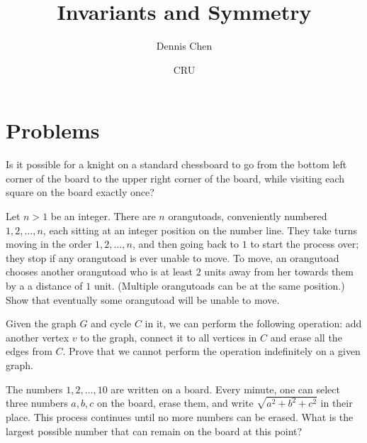 \documentclass[mast]{lucky}
\title{Invariants and Symmetry}
\author{Dennis Chen}
\date{CRU}
\begin{document}
\maketitle



\pagebreak

\section{Problems}



\begin{prob}{2}
Is it possible for a knight on a standard chessboard to go from the bottom left corner of the board to the upper right corner of the board, while visiting each square on the board exactly once?
\end{prob}

\begin{prob}[USAMTS 2019]{2}
Let $n>1$ be an integer. There are $n$ orangutoads, conveniently numbered $1,2,\dots{},n$, each sitting at an integer position on the number line. They take turns moving in the order $1,2,\dots{},n$, and then going back to $1$ to start the process over; they stop if any orangutoad is ever unable to move. To move, an orangutoad chooses another orangutoad who is at least $2$ units away from her towards them by a a distance of $1$ unit. (Multiple orangutoads can be at the same position.) Show that eventually some orangutoad will be unable to move.
\end{prob}

\begin{req}[PUMaC 2020]{2}
Given the graph $G$ and cycle $C$ in it, we can perform the following operation: add another vertex $v$ to the graph, connect it to all vertices in $C$ and erase all the edges from $C.$ Prove that we cannot perform the operation indefinitely on a given graph.
\end{req}

\begin{prob}{3}
The numbers $1, 2,\ldots , 10$ are written on a board. Every minute, one can select three numbers $a, b, c$ on the board, erase them, and write $\sqrt{a^{2}+b^{2}+c^{2}}$ in their place. This process continues until no more numbers can be erased. What is the largest possible number that can remain on the board at this point?
\end{prob}
\end{document}
